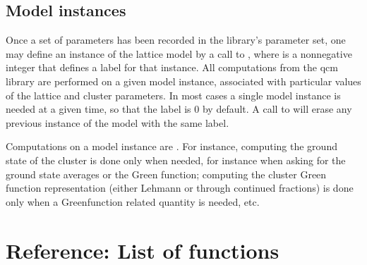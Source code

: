 \documentclass[letterpaper,10pt,english]{sphinxmanual}
\begin{document}
\section{Model instances}
\label{\detokenize{parameters:model-instances}}
\sphinxAtStartPar
Once a set of parameters has been recorded in the library’s parameter set, one may define an instance of the lattice model by a call to  , where  is a non\sphinxhyphen{}negative integer that defines a label for that instance. All computations from the qcm library are performed on a given model instance, associated with particular values of the lattice and cluster parameters. In most cases a single model instance is needed at a given time, so that the label  is 0 by default. A call to  will erase any previous instance of the model with the same label.

\sphinxAtStartPar
Computations on a model instance are . For instance, computing the ground state of the cluster is done only when needed, for instance when asking for the ground state averages or the Green function; computing the cluster Green function representation (either Lehmann or through continued fractions) is done only when a Green\sphinxhyphen{}function related quantity is needed, etc.


\chapter{Reference: List of functions}
\label{\detokenize{functions:module-pyqcm}}\label{\detokenize{functions:reference-list-of-functions}}\label{\detokenize{functions::doc}}
\end{document}
